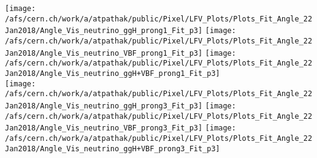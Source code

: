 \documentclass{beamer}
\begin{document}
\begin{frame}
\begin{normalsize}
\begin{center}
\texttt{[image: /afs/cern.ch/work/a/atpathak/public/Pixel/LFV\_Plots/Plots\_Fit\_Angle\_22Jan2018/Angle\_Vis\_neutrino\_ggH\_prong1\_Fit\_p3]}
\texttt{[image: /afs/cern.ch/work/a/atpathak/public/Pixel/LFV\_Plots/Plots\_Fit\_Angle\_22Jan2018/Angle\_Vis\_neutrino\_VBF\_prong1\_Fit\_p3]}
\texttt{[image: /afs/cern.ch/work/a/atpathak/public/Pixel/LFV\_Plots/Plots\_Fit\_Angle\_22Jan2018/Angle\_Vis\_neutrino\_ggH+VBF\_prong1\_Fit\_p3]}\\
\texttt{[image: /afs/cern.ch/work/a/atpathak/public/Pixel/LFV\_Plots/Plots\_Fit\_Angle\_22Jan2018/Angle\_Vis\_neutrino\_ggH\_prong3\_Fit\_p3]}
\texttt{[image: /afs/cern.ch/work/a/atpathak/public/Pixel/LFV\_Plots/Plots\_Fit\_Angle\_22Jan2018/Angle\_Vis\_neutrino\_VBF\_prong3\_Fit\_p3]}
\texttt{[image: /afs/cern.ch/work/a/atpathak/public/Pixel/LFV\_Plots/Plots\_Fit\_Angle\_22Jan2018/Angle\_Vis\_neutrino\_ggH+VBF\_prong3\_Fit\_p3]}\\
\end{center}
\end{normalsize}
\end {frame}
\end{document}
